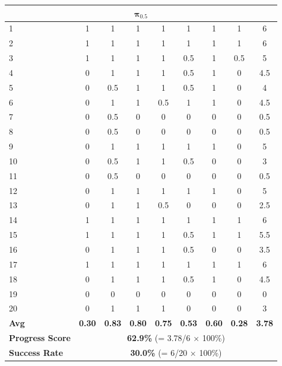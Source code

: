 \documentclass[onecolumn]{robbyant}           %
\begin{document}
\begin{table}[t]
\begin{tabular}{l|c|cccccc|c}
\midrule
\multicolumn{9}{c}{$\boldsymbol{\pi_{0.5}}$} \\
\midrule
1  & 1 & 1 & 1 & 1 & 1 & 1 & 1 & 6 \\
2  & 1 & 1 & 1 & 1 & 1 & 1 & 1 & 6 \\
3  & 1 & 1 & 1 & 1 & 0.5 & 1 & 0.5 & 5 \\
4  & 0 & 1 & 1 & 1 & 0.5 & 1 & 0 & 4.5 \\
5  & 0 & 0.5 & 1 & 1 & 0.5 & 1 & 0 & 4 \\
6  & 0 & 1 & 1 & 0.5 & 1 & 1 & 0 & 4.5 \\
7  & 0 & 0.5 & 0 & 0 & 0 & 0 & 0 & 0.5 \\
8  & 0 & 0.5 & 0 & 0 & 0 & 0 & 0 & 0.5 \\
9  & 0 & 1 & 1 & 1 & 1 & 1 & 0 & 5 \\
10 & 0 & 0.5 & 1 & 1 & 0.5 & 0 & 0 & 3 \\
11 & 0 & 0.5 & 0 & 0 & 0 & 0 & 0 & 0.5 \\
12 & 0 & 1 & 1 & 1 & 1 & 1 & 0 & 5 \\
13 & 0 & 1 & 1 & 0.5 & 0 & 0 & 0 & 2.5 \\
14 & 1 & 1 & 1 & 1 & 1 & 1 & 1 & 6 \\
15 & 1 & 1 & 1 & 1 & 0.5 & 1 & 1 & 5.5 \\
16 & 0 & 1 & 1 & 1 & 0.5 & 0 & 0 & 3.5 \\
17 & 1 & 1 & 1 & 1 & 1 & 1 & 1 & 6 \\
18 & 0 & 1 & 1 & 1 & 0.5 & 1 & 0 & 4.5 \\
19 & 0 & 0 & 0 & 0 & 0 & 0 & 0 & 0 \\
20 & 0 & 1 & 1 & 1 & 0 & 0 & 0 & 3 \\
\midrule
\textbf{Avg} & \textbf{0.30} & \textbf{0.83} & \textbf{0.80} & \textbf{0.75} & \textbf{0.53} & \textbf{0.60} & \textbf{0.28} & \textbf{3.78} \\
\textbf{Progress Score} & \multicolumn{8}{c}{\textbf{62.9\%} (= 3.78/6 $\times$ 100\%)} \\
\textbf{Success Rate} & \multicolumn{8}{c}{\textbf{30.0\%} (= 6/20 $\times$ 100\%)} \\
\bottomrule
\end{tabular}
\end{table}
\end{document}
